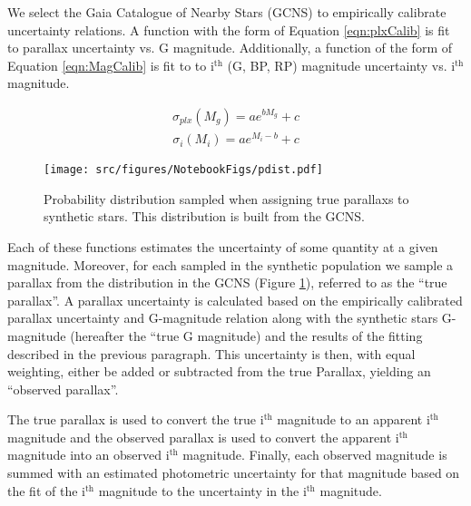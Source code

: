 We select the Gaia Catalogue of Nearby Stars (GCNS) \citep{GaiaCollaboration2021} to
empirically calibrate uncertainty relations. A function with the form of
Equation \ref{eqn:plxCalib} is fit to parallax uncertainty vs. G magnitude.
Additionally, a function of the form of Equation \ref{eqn:MagCalib} is fit to
to i$^{\text{th}}$ (G, BP, RP) magnitude uncertainty vs. i$^{\text{th}}$
magnitude.

\begin{align}\label{eqn:plxCalib}
	\sigma_{plx}(M_{g}) = ae^{bM_{g}}+c
\end{align}
\begin{align}\label{eqn:MagCalib}
	\sigma_{i}(M_{i}) = ae^{M_{i}-b}+c
\end{align}

\begin{figure}
	\centering
	\texttt{[image: src/figures/NotebookFigs/pdist.pdf]}
	\caption{Probability distribution sampled when assigning true parallaxs to
	synthetic stars. This distribution is built from the GCNS.}
	\label{fig:pdist}
\end{figure}

Each of these functions estimates the uncertainty of some quantity at a given
magnitude. Moreover, for each sampled in the synthetic population we sample a
parallax from the distribution in the GCNS (Figure \ref{fig:pdist}), referred
to as the ``true parallax''. A parallax uncertainty is calculated based on the
empirically calibrated parallax uncertainty and G-magnitude relation along with
the synthetic stars G-magnitude (hereafter the ``true G magnitude) and the
results of the fitting described in the previous paragraph. This uncertainty
is then, with equal weighting, either be added or subtracted from the true
Parallax, yielding an ``observed parallax''.

The true parallax is used to convert the true i$^{\text{th}}$ magnitude to an
apparent i$^{\text{th}}$ magnitude and the observed parallax is used to convert
the apparent i$^{\text{th}}$ magnitude into an observed i$^{\text{th}}$
magnitude. Finally, each observed magnitude is summed with an estimated
photometric uncertainty for that magnitude based on the fit of the
i$^{\text{th}}$ magnitude to the uncertainty in the i$^{\text{th}}$ magnitude.

